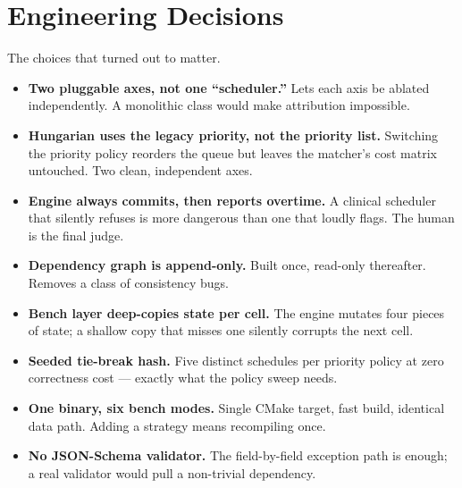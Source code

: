 \section{Engineering Decisions}
\label{sec:engineering}

The choices that turned out to matter.

\begin{itemize}
  \item \textbf{Two pluggable axes, not one ``scheduler.''}\;
        Lets each axis be ablated independently. A monolithic class
        would make attribution impossible.
  \item \textbf{Hungarian uses the legacy priority, not the
        priority list.}\;
        Switching the priority policy reorders the queue but
        leaves the matcher's cost matrix untouched. Two clean,
        independent axes.
  \item \textbf{Engine always commits, then reports overtime.}\;
        A clinical scheduler that silently refuses is more
        dangerous than one that loudly flags. The human is the
        final judge.
  \item \textbf{Dependency graph is append-only.}\;
        Built once, read-only thereafter. Removes a class of
        consistency bugs.
  \item \textbf{Bench layer deep-copies state per cell.}\;
        The engine mutates four pieces of state; a shallow copy
        that misses one silently corrupts the next cell.
  \item \textbf{Seeded tie-break hash.}\;
        Five distinct schedules per priority policy at zero
        correctness cost --- exactly what the policy sweep needs.
  \item \textbf{One binary, six bench modes.}\;
        Single CMake target, fast build, identical data path.
        Adding a strategy means recompiling once.
  \item \textbf{No JSON-Schema validator.}\;
        The field-by-field exception path is enough; a real
        validator would pull a non-trivial dependency.
\end{itemize}
